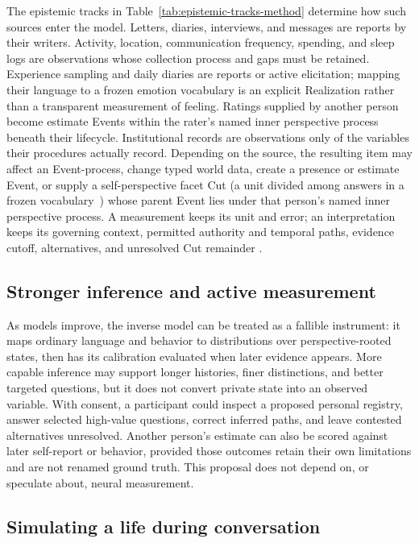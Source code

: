 \documentclass[10pt]{article}
\begin{document}
The epistemic tracks in Table~\ref{tab:epistemic-tracks-method} determine how
such sources enter the model. Letters, diaries, interviews, and messages are
reports by their writers. Activity, location, communication frequency,
spending, and sleep logs are observations whose collection process and gaps
must be retained. Experience sampling and daily diaries are reports or active
elicitation; mapping their language to a frozen emotion vocabulary is an
explicit Realization rather than a transparent measurement of feeling.
Ratings supplied by another person become estimate Events within the rater's
named inner perspective process beneath their lifecycle. Institutional
records are observations only of the variables their procedures actually
record. Depending on the source, the resulting item may affect an Event-process,
change typed world data, create a presence or estimate Event, or supply a
self-perspective facet Cut (a unit divided among answers in a frozen
vocabulary~\cite{westerbergMeaning2026}) whose parent Event lies under that person's named
inner perspective process. A
measurement keeps its unit and error; an interpretation keeps its governing
context, permitted authority and temporal paths, evidence cutoff,
alternatives, and unresolved Cut remainder
\cite{shiffman2008,ponnada2022,burns2011mobilyze}.

\subsection{Stronger inference and active measurement}

As models improve, the inverse model can be treated as a fallible instrument:
it maps ordinary language and behavior to distributions over perspective-rooted
states, then has its calibration evaluated when later evidence appears. More
capable inference may support longer histories, finer distinctions, and better
targeted questions, but it does not convert private state into an observed
variable. With consent, a participant could inspect a proposed personal
registry, answer selected high-value questions, correct inferred paths, and
leave contested alternatives unresolved. Another person's estimate can also be
scored against later self-report or behavior, provided those outcomes retain
their own limitations and are not renamed ground truth. This proposal does not
depend on, or speculate about, neural measurement.

\subsection{Simulating a life during conversation}
\label{sec:life-conversation}
\end{document}
